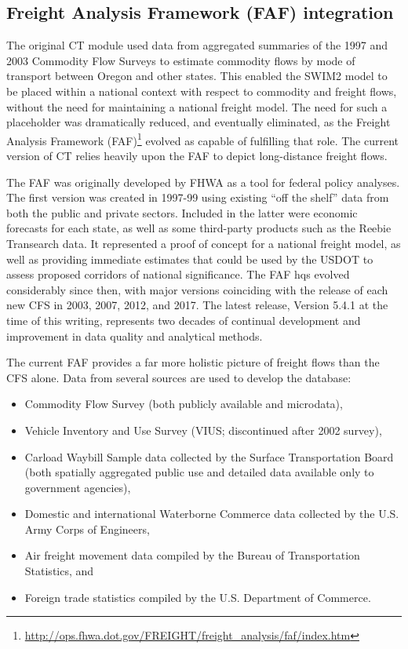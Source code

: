 \subsection{Freight Analysis Framework (FAF) integration}\label{sec:faf-integration}

The original CT module used data from aggregated summaries of the 1997 and 2003 Commodity Flow Surveys to estimate commodity flows by mode of transport between Oregon and other states. This enabled the SWIM2 model to be placed within a national context with respect to commodity and freight flows, without the need for maintaining a national freight model. The need for such a placeholder was dramatically reduced, and eventually eliminated, as the Freight Analysis Framework (FAF)\footnote{\url{http://ops.fhwa.dot.gov/FREIGHT/freight_analysis/faf/index.htm}} evolved as capable of fulfilling that role. The current version of CT relies heavily upon the FAF to depict long-distance freight flows.

The FAF was originally developed by FHWA as a tool for federal policy analyses. The first version was created in 1997-99 using existing ``off the shelf'' data from both the public and private sectors. Included in the latter were economic forecasts for each state, as well as some third-party products such as the Reebie Transearch data. It represented a proof of concept for a national freight model, as well as providing immediate estimates that could be used by the USDOT to assess proposed corridors of national significance. The FAF hqs evolved considerably since then, with major versions coinciding with the release of each new CFS in 2003, 2007, 2012, and 2017. The latest release, Version 5.4.1 at the time of this writing, represents two decades of continual development and improvement in data quality and analytical methods. 

The current FAF provides a far more holistic picture of freight flows than the CFS alone. Data from several sources are used to develop the database:
\begin{itemize}
\item Commodity Flow Survey (both publicly available and microdata),
\item Vehicle Inventory and Use Survey (VIUS; discontinued after 2002 survey),
\item Carload Waybill Sample data collected by the Surface Transportation Board (both spatially aggregated public use and detailed data available only to government agencies),
\item Domestic and international Waterborne Commerce data collected by the U.S. Army Corps of Engineers,
\item Air freight movement data compiled by the Bureau of Transportation Statistics, and
\item Foreign trade statistics compiled by the U.S. Department of Commerce.
\end{itemize}

